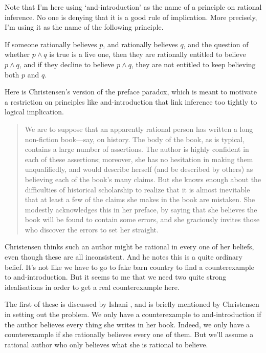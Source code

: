 \documentclass[11pt,]{book}
\providecommand{\tightlist}{%
  \setlength{\itemsep}{0pt}\setlength{\parskip}{0pt}}
\begin{document}
Note that I'm here using `and-introduction' as the name of a principle on rational inference. No one is denying that it is a good rule of implication. More precisely, I'm using it as the name of the following principle.

\begin{description}
\tightlist
\item[And-introduction]
If someone rationally believes \(p\), and rationally believes \(q\), and the question of whether \(p \wedge q\) is true is a live one, then they are rationally entitled to believe \(p \wedge q\), and if they decline to believe \(p \wedge q\), they are not entitled to keep believing both \(p\) and \(q\).
\end{description}

Here is Christensen's version of the preface paradox, which is meant to motivate a restriction on principles like and-introduction that link inference too tightly to logical implication.

\begin{quote}
We are to suppose that an apparently rational person has written a long non-fiction book---say, on history. The body of the book, as is typical, contains a large number of assertions. The author is highly confident in each of these assertions; moreover, she has no hesitation in making them unqualifiedly, and would describe herself (and be described by others) as believing each of the book's many claims. But she knows enough about the difficulties of historical scholarship to realize that it is almost inevitable that at least a few of the claims she makes in the book are mistaken. She modestly acknowledges this in her preface, by saying that she believes the book will be found to contain some errors, and she graciously invites those who discover the errors to set her straight. \citep[ 33-4]{Christensen2005}
\end{quote}

Christensen thinks such an author might be rational in every one of her beliefs, even though these are all inconsistent. And he notes this is a quite ordinary belief. It's not like we have to go to fake barn country to find a
counterexample to and-introduction. But it seems to me that we need two quite strong idealisations in order to get a real counterexample here.

The first of these is discussed by Ishani \citet{Maitra2010}, and is briefly mentioned by Christensen in setting out the problem. We only have a counterexample to and-introduction if the author believes every thing she writes in her book. Indeed, we only have a counterexample if she rationally believes every one of them. But we'll assume a rational author who only believes what she is rational to believe.
\end{document}
